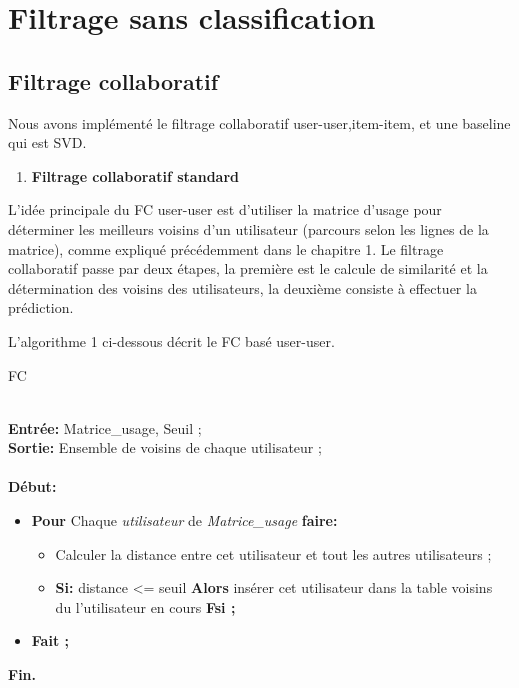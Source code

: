 \section{Filtrage sans classification}
\subsection{Filtrage collaboratif}
Nous avons implémenté le filtrage collaboratif user-user,item-item, et une baseline qui est SVD.
\begin{enumerate}[nosep,label=\textbf{\arabic*)}]
	\item \textbf{Filtrage collaboratif standard}
\end{enumerate}L'idée principale du FC user-user est d'utiliser la matrice d'usage pour déterminer les meilleurs voisins d'un utilisateur (parcours selon les lignes de la matrice), comme expliqué précédemment dans le chapitre 1. Le filtrage collaboratif passe par deux étapes, la première est le calcule de similarité et la détermination des voisins des utilisateurs, la deuxième consiste à effectuer la prédiction.

L'algorithme 1 ci-dessous décrit le FC basé user-user.

 \begin{algorithm}[H]
	\caption{FC}\label{FCUSERUSER}
	\hspace*{\algorithmicindent} \\
	\hspace*{\algorithmicindent} \textbf{Entrée:} Matrice{\_}usage, Seuil ;\\
	\hspace*{\algorithmicindent} \textbf{Sortie:} Ensemble de voisins de chaque utilisateur ;\\\\
	\hspace*{\algorithmicindent}\textbf{ Début:}
	\begin{itemize}
		
		\item []\textbf{Pour} Chaque \textit{utilisateur} de \textit{Matrice{\_}usage} \textbf{faire:} 
		   \begin{itemize}
		   	\item [] Calculer la distance entre cet utilisateur et tout les autres utilisateurs ;
		   	\item [] \textbf{Si:} distance  <= seuil \textbf{Alors} insérer cet utilisateur dans la table voisins du l'utilisateur en cours  \textbf{Fsi ;}
		   \end{itemize}
	   \item []\textbf{Fait ;} 
	
	\end{itemize}
	\hspace*{\algorithmicindent}\textbf{ Fin.}
\end{algorithm} 

